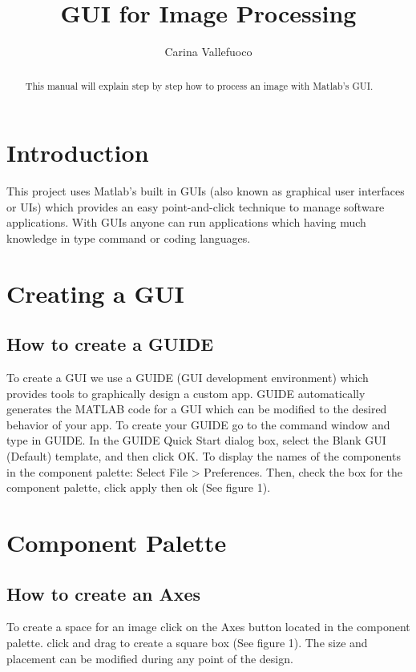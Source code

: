 \documentclass[a4paper]{article}
\title{GUI for Image Processing}
\author{Carina Vallefuoco}
\begin{document}
\maketitle

\begin{abstract}
This manual will explain step by step how to process an image with Matlab's GUI.
\end{abstract}

\section{Introduction}

This project uses Matlab's built in GUIs (also known as graphical user interfaces or UIs) which provides an easy point-and-click technique to manage software applications. With GUIs anyone can run applications which having much knowledge in type command or coding languages. 

\section{Creating a GUI}
\subsection{How to create a GUIDE}

To create a GUI we use a GUIDE (GUI development environment) which provides tools to graphically design a custom app. GUIDE automatically generates the MATLAB code for a GUI which can be modified to the desired behavior of your app.
To create your GUIDE go to the command window and type in GUIDE. In the GUIDE Quick Start dialog box, select the Blank GUI (Default) template, and then click OK. To display the names of the components in the component palette: Select File > Preferences. Then, check the box for the component palette, click apply then ok (See figure 1).

\section{Component Palette}
\subsection{How to create an Axes}

To create a space for an image click on the Axes button located in the component palette. click and drag to create a square box (See figure 1). The size and placement can be modified during any point of the design.
\end{document}
